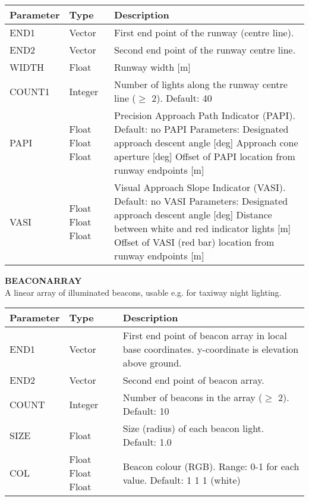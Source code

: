 \documentclass[Orbiter Developer Manual.tex]{subfiles}
\begin{document}
	\begin{longtable}{ |p{}|p{}|p{}| }
	\hline\rule{0pt}{2ex}
	\textbf{Parameter} & \textbf{Type} & \textbf{Description}\\
	\hline\rule{0pt}{2ex}
	END1 & Vector & First end point of the runway (centre line).\\
	\hline\rule{0pt}{2ex}
	END2 & Vector & Second end point of the runway centre line.\\
	\hline\rule{0pt}{2ex}
	WIDTH & Float & Runway width [m]\\
	\hline\rule{0pt}{2ex}
	COUNT1 & Integer & Number of lights along the runway centre line ($\geq$ 2). Default: 40\\
	\hline\rule{0pt}{2ex}
	PAPI & Float Float Float & Precision Approach Path Indicator (PAPI). Default: no PAPI\newline
	Parameters:\newline
	Designated approach descent angle [deg]\newline
	Approach cone aperture [deg]\newline
	Offset of PAPI location from runway endpoints [m]\\
	\hline\rule{0pt}{2ex}
	VASI & Float Float Float & Visual Approach Slope Indicator (VASI). Default: no VASI\newline
	Parameters:\newline
	Designated approach descent angle [deg]\newline
	Distance between white and red indicator lights [m]\newline
	Offset of VASI (red bar) location from runway endpoints [m]\\
	\hline
	\end{longtable}

\noindent
\textbf{BEACONARRAY}\\
A linear array of illuminated beacons, usable e.g. for taxiway night lighting.

	\begin{longtable}{ |p{}|p{}|p{}| }
	\hline\rule{0pt}{2ex}
	\textbf{Parameter} & \textbf{Type} & \textbf{Description}\\
	\hline\rule{0pt}{2ex}
	END1 & Vector & First end point of beacon array in local base coordinates. y-coordinate is elevation above ground.\\
	\hline\rule{0pt}{2ex}
	END2 & Vector & Second end point of beacon array.\\
	\hline\rule{0pt}{2ex}
	COUNT & Integer & Number of beacons in the array ($\geq$ 2). Default: 10\\
	\hline\rule{0pt}{2ex}
	SIZE & Float & Size (radius) of each beacon light. Default: 1.0\\
	\hline\rule{0pt}{2ex}
	COL & Float Float Float & Beacon colour (RGB). Range: 0-1 for each value. Default: 1 1 1 (white)\\
	\hline
	\end{longtable}
\end{document}
